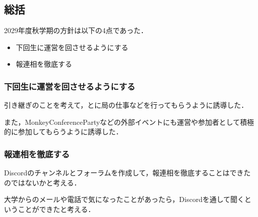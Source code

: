 \subsection*{\thirdGrade{}総括}


2029年度秋学期の\thirdGrade{}方針は以下の4点であった．

\begin{itemize}
    \item 下回生に運営を回させるようにする
    \item 報連相を徹底する
\end{itemize}

\subsubsection*{下回生に運営を回させるようにする}
引き継ぎのことを考えて，\firstGrade{}と\secondGrade{}に局の仕事などを行ってもらうように誘導した．

また，MonkeyConferencePartyなどの外部イベントにも運営や参加者として積極的に参加してもらうように誘導した．

\subsubsection*{報連相を徹底する}
Discordのチャンネルとフォーラムを作成して，報連相を徹底することはできたのではないかと考える．

大学からのメールや電話で気になったことがあったら，Discordを通して聞くということができたと考える．

